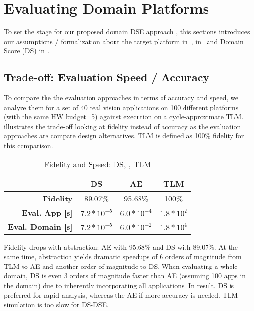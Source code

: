 \section{Evaluating Domain Platforms}
\label{sec:EvaOp}

To set the stage for our proposed domain DSE approach ,
this sections introduces our assumptions / formalization about the
target platform in~,  in~ and Domain Score (DS) in~. ~ 






\subsection{Trade-off: Evaluation Speed / Accuracy }
\label{sec:eva:sum}

To compare the the evaluation approaches in terms of accuracy and speed, we analyze them for a set of 40 real vision applications on 100 different platforms (with the same HW budget=5) against execution on a cycle-approximate TLM. %
 illustrates the trade-off looking at fidelity instead of accuracy as the evaluation approaches are compare design alternatives. TLM is defined as 100\% fidelity for this comparison.

\begin{table}[h]
	\caption{Fidelity and Speed: DS, , TLM}
	\label{tab:fidelity}
	\centering
	\begin{tabular}{r||c|c|c}
		\toprule
		  & \textbf{DS}& \textbf{AE}& \textbf{TLM}\\
		\hline
		\midrule
		\textbf{Fidelity} & 89.07\%& 95.68\%& 100\%\\
		\hline
		\textbf{Eval. App [s]} & $7.2*10^{-5}$ & $6.0*10^{-4}$ & $1.8*10^2$ \\
		\hline
		\textbf{Eval. Domain [s]} & $7.2*10^{-5}$ & $6.0*10^{-2}$ & $1.8*10^4$ \\
		\bottomrule
	\end{tabular}
\end{table} 

Fidelity drops with abstraction: AE with 95.68\% and DS with 89.07\%. At the same time, abstraction yields dramatic speedups of 6 orders of magnitude from TLM to AE and another order of magnitude to DS. When evaluating a whole domain, DS is even 3 orders of magnitude faster than AE (assuming 100 apps in the domain) due to inherently incorporating all applications. In result, DS is preferred for rapid analysis, whereas the AE if more accuracy is needed. TLM simulation is too slow for DS-DSE.